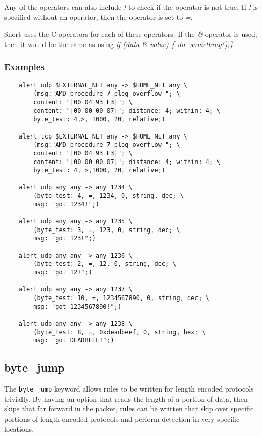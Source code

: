 \documentclass[english]{report}
\newenvironment{note}{
\samepage
    \vspace{10pt}{\textsf{
        {\hspace{7pt}\Huge{$\triangle$\hspace{-12.5pt}{\Large{$^!$}}}}\hspace{5pt}
        {\Large{NOTE}}
    }
    }
   \begin{center}
    \par\vspace{-17pt}

    \begin{lrbox}{\savepar}
    \begin{minipage}[r]{6in}
}
{
    \end{minipage}
    \end{lrbox}
    \fbox{
        \usebox{
            \savepar
	}
    }
    \par\vskip10pt
    \end{center}
}
\newenvironment{note}{
        \begin{rawhtml}
        <p><table border="1"><tr><td><b>
        Note:&nbsp;&nbsp;</b>
        \end{rawhtml}
}{
        \begin{rawhtml}
        </b></td></tr></table></p>
        \end{rawhtml}
}
\begin{document}
Any of the operators can also include \emph{!} to check if the operator is not
true.  If \emph{!} is specified without an operator, then the operator is set
to \emph{=}.

\begin{note}

Snort uses the C operators for each of these operators.  If the \emph{\&}
operator is used, then it would be the same as using \emph{if (data \& value)
\{ do\_something();\} }

\end{note}

\subsubsection{Examples}

\begin{verbatim}
    alert udp $EXTERNAL_NET any -> $HOME_NET any \
        (msg:"AMD procedure 7 plog overflow "; \
        content: "|00 04 93 F3|"; \
        content: "|00 00 00 07|"; distance: 4; within: 4; \
        byte_test: 4,>, 1000, 20, relative;)
    
    alert tcp $EXTERNAL_NET any -> $HOME_NET any \
        (msg:"AMD procedure 7 plog overflow "; \
        content: "|00 04 93 F3|"; \
        content: "|00 00 00 07|"; distance: 4; within: 4; \
        byte_test: 4, >,1000, 20, relative;)
    
    alert udp any any -> any 1234 \
        (byte_test: 4, =, 1234, 0, string, dec; \
        msg: "got 1234!";)
    
    alert udp any any -> any 1235 \
        (byte_test: 3, =, 123, 0, string, dec; \
        msg: "got 123!";)
    
    alert udp any any -> any 1236 \
        (byte_test: 2, =, 12, 0, string, dec; \
        msg: "got 12!";)
    
    alert udp any any -> any 1237 \
        (byte_test: 10, =, 1234567890, 0, string, dec; \
        msg: "got 1234567890!";)
    
    alert udp any any -> any 1238 \
        (byte_test: 8, =, 0xdeadbeef, 0, string, hex; \
        msg: "got DEADBEEF!";)
\end{verbatim}

\subsection{byte\_jump}
\label{sub:byte_jump}

The \texttt{byte\_jump} keyword allows rules to be written for length encoded
protocols trivially. By having an option that reads the length of a portion of
data, then skips that far forward in the packet, rules can be written that skip
over specific portions of length-encoded protocols and perform detection in
very specific locations.
\end{document}
